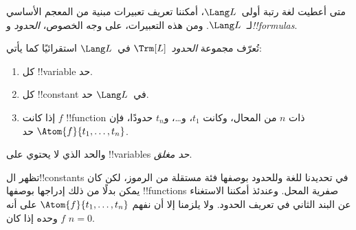 \documentclass[../../../include/open-logic-section]{subfiles}
\begin{document}


متى أعطيت لغة رتبة أولى~$\Lang L$، أمكننا تعريف تعبيرات مبنية من
المعجم الأساسي لـ~$\Lang L$. ومن هذه التعبيرات، على وجه الخصوص،
\emph{الحدود} و\emph{!!{formula}s}.

\begin{defn}[الحدود]
تُعرّف مجموعة \emph{الحدود}~$\Trm[L]$ في~$\Lang L$ استقرائيًا كما
يأتي:
\begin{enumerate}
\item كل !!{variable} حد.
\item كل !!{constant} في~$\Lang L$ حد.
\item إذا كانت $f$ !!{function} ذات $n$ من المحال، وكانت
  $t_1$، و\dots، و$t_n$ حدودًا، فإن
  $\Atom{f}{t_1, \ldots, t_n}$ حد.
\end{enumerate}
والحد الذي لا يحتوي على !!{variable}s \emph{حد مغلق}.
\end{defn}

\begin{explain}
تظهر ال!!{constant}s في تحديدنا للغة وللحدود بوصفها فئة مستقلة من
الرموز، لكن كان يمكن بدلًا من ذلك إدراجها بوصفها !!{function}s صفرية
المحل. وعندئذ أمكننا الاستغناء عن البند الثاني في تعريف الحدود. ولا
يلزمنا إلا أن نفهم $\Atom{f}{t_1, \ldots, t_n}$ على أنه $f$ وحده إذا
كان $n = 0$.
\end{explain}
\end{document}
